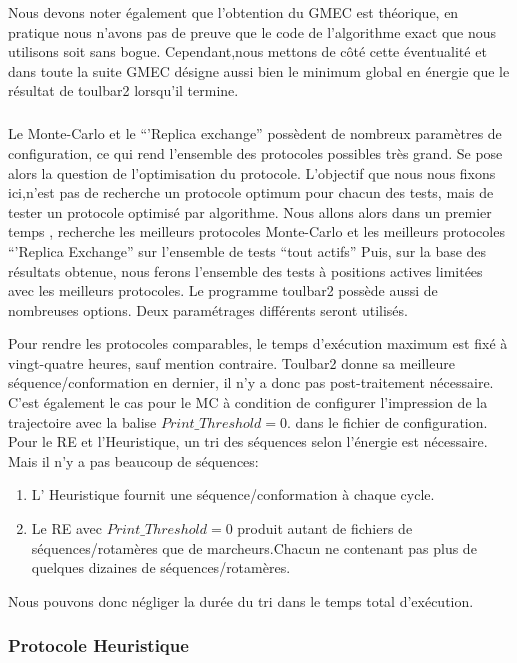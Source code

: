 Nous devons noter également que l'obtention du GMEC est théorique, en pratique nous n'avons pas de preuve que le code de l'algorithme exact que nous utilisons soit sans bogue. Cependant,nous mettons de côté cette éventualité et dans toute la suite GMEC désigne aussi bien le minimum global en énergie que le résultat de toulbar2 lorsqu'il termine.  
\subparagraph{}
Le Monte-Carlo et le ``'Replica exchange'' possèdent de nombreux paramètres de configuration, ce qui rend l'ensemble des protocoles possibles très grand. Se pose alors la question de l'optimisation du protocole. L'objectif que nous nous fixons ici,n'est pas de recherche un protocole optimum pour chacun des tests, mais de tester un protocole optimisé par algorithme.
Nous allons alors dans un premier temps , recherche les meilleurs protocoles Monte-Carlo et les meilleurs protocoles ``'Replica Exchange'' sur l'ensemble de tests ``tout actifs''
Puis, sur la base des résultats obtenue, nous ferons l'ensemble des tests à positions actives limitées avec les meilleurs protocoles.
Le programme toulbar2 possède aussi de nombreuses options. Deux paramétrages différents seront utilisés.


Pour rendre les protocoles comparables, le temps d'exécution maximum est fixé à vingt-quatre heures, sauf mention contraire.
Toulbar2 donne sa meilleure séquence/conformation en dernier, il n'y a donc pas post-traitement nécessaire.
C'est également le cas pour le MC à condition de configurer l'impression de la trajectoire avec la balise $Print\_Threshold=0$. dans le fichier de configuration.
Pour le RE et l'Heuristique, un tri des séquences selon l'énergie est nécessaire. Mais il n'y a pas beaucoup de séquences: 
\begin{enumerate}
\item L' Heuristique fournit une séquence/conformation à chaque cycle.
\item Le RE avec $Print\_Threshold=0$ produit autant de fichiers de séquences/rotamères que de marcheurs.Chacun ne contenant pas plus de quelques dizaines de séquences/rotamères. 
\end{enumerate}

Nous pouvons donc négliger la durée du tri dans le temps total d'exécution.    


\subsubsection{Protocole Heuristique}

